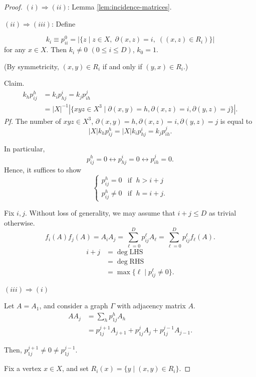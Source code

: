 \documentclass[
]{book}
\theoremstyle{definition}
\theoremstyle{definition}
\theoremstyle{definition}
\theoremstyle{definition}
\theoremstyle{remark}
\begin{document}
\begin{proof}
\leavevmode

\((i)\Rightarrow (ii)\): Lemma \ref{lem:incidence-matrices}.

\((ii)\Rightarrow (iii)\): Define

\[k_i \equiv p^0_{ii} = |\{z\mid z\in X, \; \partial(x,z) = i, \; ((x,z)\in R_i)\}|\]
for any \(x\in X\).
Then \(k_i \neq 0\) \((0\leq i\leq D)\), \(k_0 = 1\).

(By symmetricity, \((x,y)\in R_i\) if and only if \((y,x)\in R_i\).)

Claim.
\begin{align}
k_hp^h_{ij} & = k_ip^i_{hj} = k_jp^j_{ih}\\
& = |X|^{-1}|\{xyz\in X^3\mid \partial(x,y) = h, \partial(x,z) = i, \partial(y,z) = j\}|.
\end{align}
\emph{Pf.}
The number of \(xyz\in X^3\), \(\partial(x,y) = h, \partial(x,z) = i, \partial(y,z) = j\) is equal to
\[|X|k_hp^h_{ij} = |X|k_ip^i_{hj} = k_jp^j_{ih}.\]

In particular,
\[p^h_{ij} = 0 \leftrightarrow p^i_{hj} =0 \leftrightarrow p^j_{ih} = 0.\]
Hence, it suffices to show
\[\begin{cases}
p^h_{ij} = 0 & \text{if }\; h > i+j\\
p^h_{ij} \neq 0 & \text{if }\; h = i+j.
\end{cases}\]

Fix \(i,j\). Without loss of generality, we may assume that \(i+j\leq D\) as trivial otherwise.
\[f_i(A)f_j(A) = A_iA_j = \sum_{\ell = 0}^Dp^{\ell}_{ij}A_\ell = \sum_{\ell=0}^Dp^\ell_{ij}f_\ell(A).\]
\begin{align}
i + j & = \deg \mathrm{LHS}\\
& = \deg \mathrm{RHS}\\
& = \max\{\ell\mid p^\ell_{ij}\neq 0\}.
\end{align}

\((iii)\Rightarrow (i)\)

Let \(A = A_1\), and consider a graph \(\Gamma\) with adjacency matrix \(A\).
\begin{align}
AA_j & = \sum_{h}p^h_{1j}A_h\\
& = p^{j+1}_{1j} A_{j+1} + p^j_{1j}A_j + p^{j-1}_{1j}A_{j-1}.
\end{align}

Then, \(p^{j+1}_{1j} \neq 0 \neq p^{j-1}_{1j}\).

Fix a vertex \(x\in X\), and set \(R_i(x) = \{y\mid (x,y)\in R_i\}\).


\end{proof}
\end{document}
